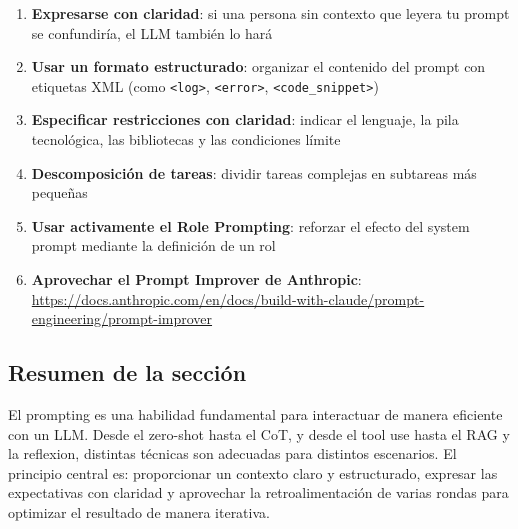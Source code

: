 \begin{enumerate}
    \item \textbf{Expresarse con claridad}: si una persona sin contexto que leyera tu prompt se confundiría, el LLM también lo hará
    \item \textbf{Usar un formato estructurado}: organizar el contenido del prompt con etiquetas XML (como \texttt{<log>}, \texttt{<error>}, \texttt{<code\_snippet>})
    \item \textbf{Especificar restricciones con claridad}: indicar el lenguaje, la pila tecnológica, las bibliotecas y las condiciones límite
    \item \textbf{Descomposición de tareas}: dividir tareas complejas en subtareas más pequeñas
    \item \textbf{Usar activamente el Role Prompting}: reforzar el efecto del system prompt mediante la definición de un rol
    \item \textbf{Aprovechar el Prompt Improver de Anthropic}: \url{https://docs.anthropic.com/en/docs/build-with-claude/prompt-engineering/prompt-improver}
\end{enumerate}

\subsection{Resumen de la sección}

El prompting es una habilidad fundamental para interactuar de manera eficiente con un LLM. Desde el zero-shot hasta el CoT, y desde el tool use hasta el RAG y la reflexion, distintas técnicas son adecuadas para distintos escenarios. El principio central es: proporcionar un contexto claro y estructurado, expresar las expectativas con claridad y aprovechar la retroalimentación de varias rondas para optimizar el resultado de manera iterativa.
